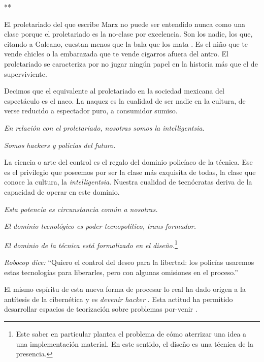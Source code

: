**

El proletariado del que escribe Marx no puede ser entendido nunca como
una clase porque el proletariado es la no-clase por excelencia. Son los
nadie, los que, citando a Galeano, cuestan menos que la bala que los
mata \cite{Galeano2015}. Es el niño que te vende chicles
o la embarazada que te vende cigarros afuera del antro. El proletariado
se caracteriza por no jugar ningún papel en la historia más que el de
superviviente.

Decimos que el equivalente al proletariado en la sociedad mexicana del
espectáculo es el naco. La naquez es la cualidad de ser nadie en la
cultura, de verse reducido a espectador puro, a consumidor sumiso.

\emph{En relación con el proletariado, nosotras somos la
intelligentsia.}

\emph{Somos hackers y policías del futuro.}

La ciencia o arte del control es el regalo del dominio policíaco de la
técnica. Ese es el privilegio que poseemos por ser la clase más
exquisita de todas, la clase que conoce la cultura, la
\emph{intelligentsia}. Nuestra cualidad de tecnócratas deriva de la
capacidad de operar en este dominio.

\emph{Esta potencia es circunstancia común a nosotras.}

\emph{El dominio tecnológico es poder tecnopolítico, trans-formador.}

\emph{El dominio de la técnica está formalizado en el
diseño.}\footnote{Este saber en particular plantea el problema de cómo
  aterrizar una idea a una implementación material. En este sentido, el
  diseño es una técnica de la presencia.}

\emph{Robocop dice:} ``Quiero el control del deseo para la libertad: los
policías usaremos estas tecnologías para liberarles, pero con algunas
omisiones en el proceso.''

El mismo espíritu de esta nueva forma de procesar lo real ha dado origen
a la antítesis de la cibernética y es \emph{devenir
hacker} \cite{Swartz2011}. Esta actitud ha permitido
desarrollar espacios de teorización sobre problemas
por-venir \cite{Williams2017}.
